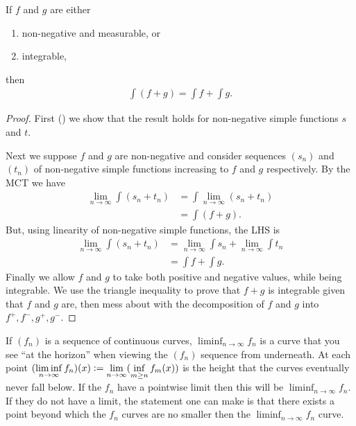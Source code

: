 \begin{theorem*}
  If $f$ and $g$ are either
  \begin{enumerate}
  \item non-negative and measurable, or
  \item integrable,
  \end{enumerate}
  then
  \begin{align*}
    \int (f + g) = \int f + \int g.
  \end{align*}
\end{theorem*}

\begin{proof}
  First () we show that the result holds for non-negative simple functions $s$ and $t$.

  Next we suppose $f$ and $g$ are non-negative and consider sequences $(s_n)$ and $(t_n)$ of non-negative
  simple functions increasing to $f$ and $g$ respectively. By the MCT we have
  \begin{align*}
    \lim_{n\to\infty} \int (s_n + t_n)
    &= \int \lim_{n\to\infty} (s_n + t_n) \\
    &= \int (f + g).
  \end{align*}
  But, using linearity of non-negative simple functions, the LHS is
  \begin{align*}
    \lim_{n\to\infty} \int (s_n + t_n)
    &= \lim_{n\to\infty} \int s_n + \lim_{n\to\infty} \int t_n \\
    &= \int f + \int g.
  \end{align*}
  Finally we allow $f$ and $g$ to take both positive and negative values, while being integrable. We use the
  triangle inequality to prove that $f + g$ is integrable given that $f$ and $g$ are, then mess about with the
  decomposition of $f$ and $g$ into $f^+, f^-, g^+, g^-$.
\end{proof}

\begin{intuition*}
  If $(f_n)$ is a sequence of continuous curves, $\liminf_{n\to\infty} f_n$ is a curve that you see ``at the
  horizon​'' when viewing the $(f_n)$ sequence from underneath. At each
  point $(\liminf_{n\to\infty} f_n)(x) := \limn (\inf_{m\geq n}f_m(x))$ is the height that the curves
  eventually never fall below. If the $f_n$ have a pointwise limit then this will
  be $\liminf_{n\to\infty} f_n$. If they do not have a limit, the statement one can make is that there exists a
  point beyond which the $f_n$ curves are no smaller then the $\liminf_{n\to\infty} f_n$ curve.
\end{intuition*}


